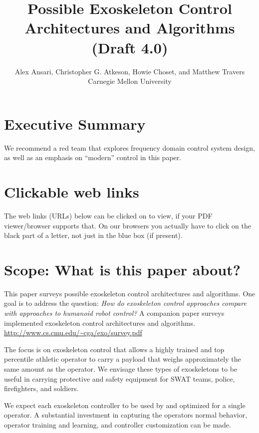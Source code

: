 \documentclass[letterpaper,12pt,fullpage]{article}
\begin{document}
\title{Possible Exoskeleton Control Architectures and Algorithms\\
(Draft 4.0)}

\author{Alex Ansari, Christopher G. Atkeson, Howie Choset, and Matthew Travers\\
Carnegie Mellon University}

\maketitle

\section{Executive Summary}

We recommend a red team that explores frequency domain control system
design, as well as an emphasis on ``modern'' control in this paper.

\section{Clickable web links}

The web links (URLs) below can be clicked on to view, if your PDF viewer/browser supports that. On our browsers you actually have to click on the black
part of a letter, not just in the blue box (if present).

\section{Scope: What is this paper about?}

This paper surveys possible exoskeleton control architectures and
algorithms.
One goal is to address the question:
{\it How do exoskeleton control approaches compare with 
approaches to humanoid robot control?}
A companion paper surveys implemented exoskeleton control architectures
and algorithms.\\
\url{http://www.cs.cmu.edu/~cga/exo/survey.pdf}

The focus is on exoskeleton control that allows a
highly trained and top percentile athletic 
operator to carry a payload that weighs approximately the same amount
as the operator. We envisage these types of exoskeletons to be useful
in carrying protective and safety equipment for SWAT teams, police,
firefighters, and soldiers. 

We expect each exoskeleton controller
to be used by and optimized for a single operator.
A substantial investment in capturing the operators normal behavior,
operator training and learning, and controller customization can be made.
\end{document}
